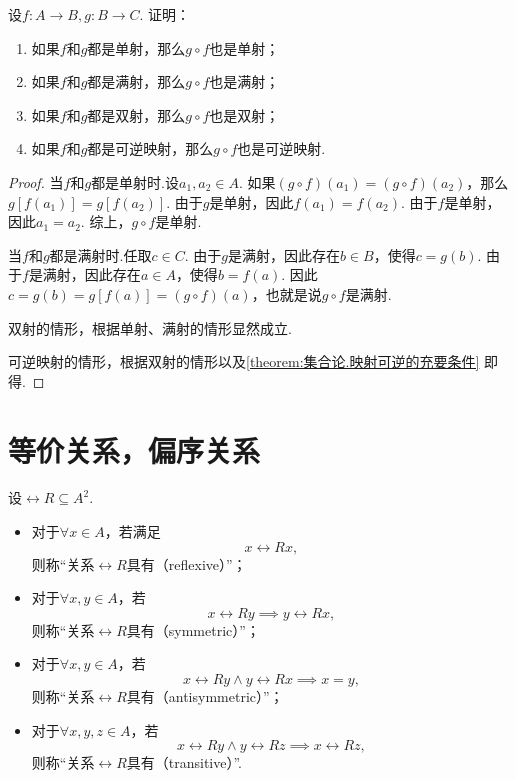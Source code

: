 \begin{example}
设\(f\colon A \to B, g\colon B \to C\).
证明：\begin{enumerate}
\item 如果\(f\)和\(g\)都是单射，那么\(g \circ f\)也是单射；
\item 如果\(f\)和\(g\)都是满射，那么\(g \circ f\)也是满射；
\item 如果\(f\)和\(g\)都是双射，那么\(g \circ f\)也是双射；
\item 如果\(f\)和\(g\)都是可逆映射，那么\(g \circ f\)也是可逆映射.
\end{enumerate}
\begin{proof}
当\(f\)和\(g\)都是单射时.设\(a_1,a_2 \in A\).
如果\((g \circ f)(a_1) = (g \circ f)(a_2)\)，那么\(g[f(a_1)] = g[f(a_2)]\).
由于\(g\)是单射，因此\(f(a_1) = f(a_2)\).
由于\(f\)是单射，因此\(a_1 = a_2\).
综上，\(g \circ f\)是单射.

当\(f\)和\(g\)都是满射时.任取\(c \in C\).
由于\(g\)是满射，因此存在\(b \in B\)，使得\(c = g(b)\).
由于\(f\)是满射，因此存在\(a \in A\)，使得\(b = f(a)\).
因此\(c = g(b) = g[f(a)] = (g \circ f)(a)\)，也就是说\(g \circ f\)是满射.

双射的情形，根据单射、满射的情形显然成立.

可逆映射的情形，根据双射的情形以及\cref{theorem:集合论.映射可逆的充要条件} 即得.
\end{proof}
\end{example}

\section{等价关系，偏序关系}
\begin{definition}
设\(\rel{R} \subseteq A^2\).
\begin{itemize}
	\item 对于\(\forall x \in A\)，若满足\[
		x\rel{R}x,
	\]
	则称“关系\(\rel{R}\)具有（reflexive）”；

	\item 对于\(\forall x,y \in A\)，若\[
		x\rel{R}y \implies y\rel{R}x,
	\]
	则称“关系\(\rel{R}\)具有（symmetric）”；

	\item 对于\(\forall x,y \in A\)，若\[
		x\rel{R}y \land y\rel{R}x \implies x = y,
	\]
	则称“关系\(\rel{R}\)具有（antisymmetric）”；

	\item 对于\(\forall x,y,z \in A\)，若\[
		x\rel{R}y \land y\rel{R}z \implies x\rel{R}z,
	\]
	则称“关系\(\rel{R}\)具有（transitive）”.
\end{itemize}
\end{definition}

